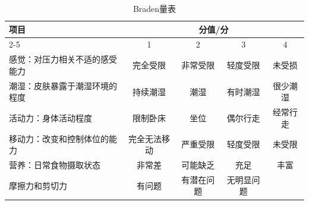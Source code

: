 \documentclass[11pt, a4paper]{ctexart}
\begin{document}
\begin{table}[htbp]
	\centering
	\caption{Braden量表}
	\small
	\begin{tabular}{|p{4cm}|c|c|c|c|}
		\hline
		\multirow{2}{*}{\textbf{项目}} & \multicolumn{4}{c|}{\textbf{分值/分}}                        \\
		\cline{2-5}
		                             & 1                                  & 2     & 3     & 4    \\
		\hline
		感觉：对压力相关不适的感受能力              & 完全受限                               & 非常受限  & 轻度受限  & 未受损  \\
		潮湿：皮肤暴露于潮湿环境的程度              & 持续潮湿                               & 潮湿    & 有时潮湿  & 很少潮湿 \\
		活动力：身体活动程度                   & 限制卧床                               & 坐位    & 偶尔行走  & 经常行走 \\
		移动力：改变和控制体位的能力               & 完全无法移动                             & 严重受限  & 轻度受限  & 未受限  \\
		营养：日常食物摄取状态                  & 非常差                                & 可能缺乏  & 充足    & 丰富   \\
		摩擦力和剪切力                      & 有问题                                & 有潜在问题 & 无明显问题 &      \\
		\hline
	\end{tabular}
\end{table}
\end{document}
